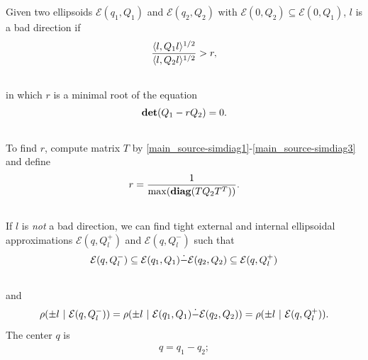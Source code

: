 \documentclass[letterpaper,10pt,english]{sphinxmanual}
\begin{document}
Given two ellipsoids ${\mathcal E}(q_1,Q_1)$ and
${\mathcal E}(q_2,Q_2)$ with
${\mathcal E}(0,Q_2)\subseteq{\mathcal E}(0,Q_1)$, $l$ is a
bad direction if
\begin{gather}
\begin{split}\frac{\langle l,Q_1l\rangle^{1/2}}{\langle l,Q_2l\rangle^{1/2}}>r,\end{split}\notag\\\begin{split}\end{split}\notag
\end{gather}
in which $r$ is a minimal root of the equation
\begin{gather}
\begin{split}{\bf det}(Q_1-rQ_2) = 0.\end{split}\notag\\\begin{split}\end{split}\notag
\end{gather}
To find $r$, compute matrix $T$ by \eqref{main_source-simdiag1}-\eqref{main_source-simdiag3}
and define
\begin{gather}
\begin{split}r = \frac{1}{\max({\bf diag}(TQ_2T^T))}.\end{split}\notag\\\begin{split}\end{split}\notag
\end{gather}
If $l$ is \emph{not} a bad direction, we can find tight external and
internal ellipsoidal approximations ${\mathcal E}(q,Q^+_l)$ and
${\mathcal E}(q,Q^-_l)$ such that
\begin{gather}
\begin{split}{\mathcal E}(q,Q^-_l)\subseteq{\mathcal E}(q_1,Q_1)\dot{-}{\mathcal E}(q_2,Q_2)\subseteq{\mathcal E}(q,Q^+_l)\end{split}\notag\\\begin{split}\end{split}\notag
\end{gather}
and
\begin{gather}
\begin{split}\rho(\pm l ~|~ {\mathcal E}(q,Q_l^-)) =
\rho(\pm l ~|~ {\mathcal E}(q_1,Q_1)\dot{-}{\mathcal E}(q_2,Q_2)) =
\rho(\pm l ~|~ {\mathcal E}(q,Q_l^+)).\end{split}\notag
\end{gather}
The center $q$ is
\label{main_source:equation-minkdiff_c}\begin{gather}
\begin{split}q = q_1 - q_2;\end{split}\label{main_source-minkdiff_c}
\end{gather}
\end{document}
